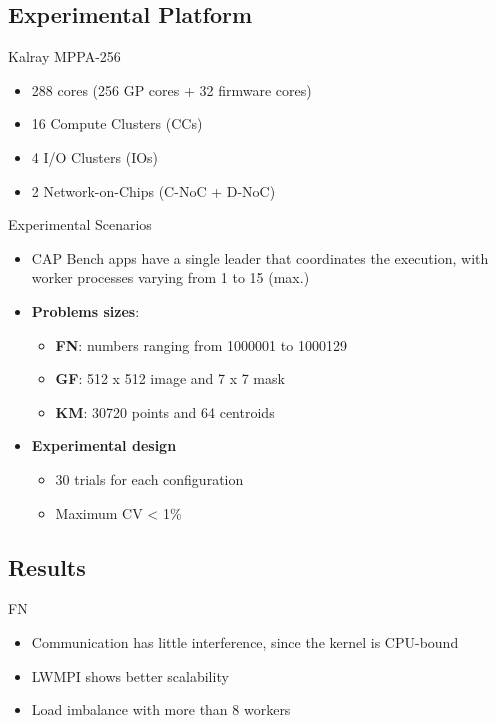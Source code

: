 \documentclass[english,aspectratio=169]{lapesd-slides}
\begin{document}
    \subsection{Experimental Platform}
      \begin{frame}{Kalray MPPA-256}
        \begin{itemize}
          \item 288 cores (256 GP cores + 32 firmware cores)
          \item 16 Compute Clusters (CCs)
          \item 4 I/O Clusters (IOs)
          \item 2 Network-on-Chips (C-NoC + D-NoC)
        \end{itemize}

      \end{frame}

      \begin{frame}{Experimental Scenarios}
        \begin{itemize}
          \item CAP Bench apps have a single leader that coordinates the execution, with
            worker processes varying from 1 to 15 (max.)

          \item \textbf{Problems sizes}:
          \begin{itemize}
            \item \textbf{FN}: numbers ranging from 1000001 to 1000129
            \item \textbf{GF}: 512 x 512 image and 7 x 7 mask
            \item \textbf{KM}: 30720 points and 64 centroids
          \end{itemize}

          \item \textbf{Experimental design}
          \begin{itemize}
            \item 30 trials for each configuration
            \item Maximum CV < 1\%
          \end{itemize}
        \end{itemize}
      \end{frame}

    \subsection{Results}
      \begin{frame}{FN}

        \begin{itemize}
          \item Communication has little interference, since the kernel is CPU-bound
          \item LWMPI shows better scalability
          \item Load imbalance with more than 8 workers
        \end{itemize}
      \end{frame}
\end{document}
